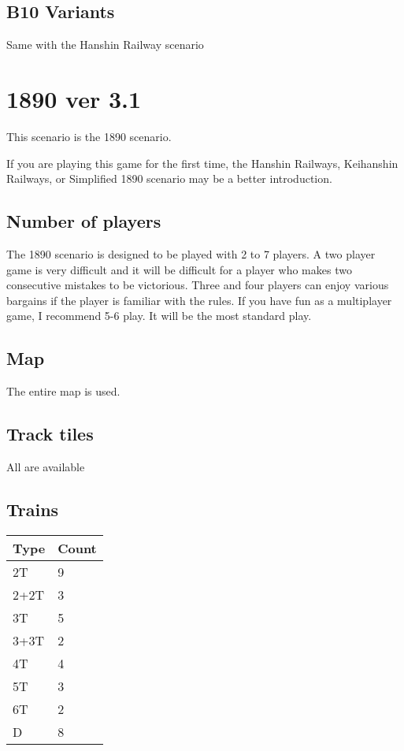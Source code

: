 \documentclass{article}
\begin{document}
\begin{CJK}{UTF8}{min}
\begin{multicols}{2}
\subsection{B10 Variants}
Same with the Hanshin Railway scenario

\newpage
\section{1890 ver 3.1}

This scenario is the 1890 scenario.

If you are playing this game for the first time, the Hanshin Railways,
Keihanshin Railways, or Simplified 1890 scenario may be a better
introduction.

\subsection{Number of players}

The 1890 scenario is designed to be played with 2 to 7 players. A two
player game is very difficult and it will be difficult for a player
who makes two consecutive mistakes to be victorious. Three and four
players can enjoy various bargains if the player is familiar with the
rules. If you have fun as a multiplayer game, I recommend 5-6 play. It
will be the most standard play.

\subsection{Map}

The entire map is used.

\subsection{Track tiles}

All are available

\subsection{Trains}

\begin{tabular}{ll}
Type & Count \\
\hline
2T & 9\\
2+2T & 3\\
3T & 5 \\
3+3T & 2 \\
4T & 4 \\
5T & 3 \\
6T & 2 \\
D & 8
\end{tabular}


\end{multicols}
\end{CJK}
\end{document}
